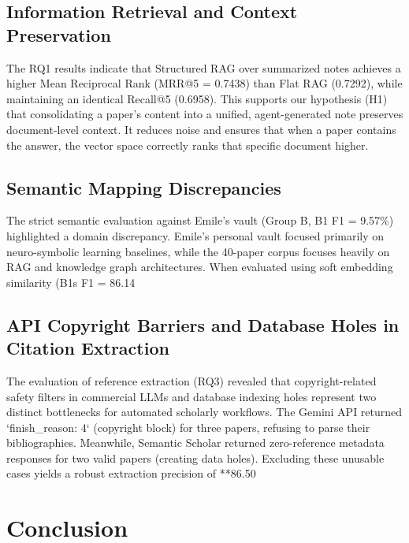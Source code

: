 \documentclass[runningheads]{llncs}
\begin{document}
\subsection{Information Retrieval and Context Preservation}
The RQ1 results indicate that Structured RAG over summarized notes achieves a higher Mean Reciprocal Rank (MRR@5 = 0.7438) than Flat RAG (0.7292), while maintaining an identical Recall@5 (0.6958). This supports our hypothesis (H1) that consolidating a paper's content into a unified, agent-generated note preserves document-level context. It reduces noise and ensures that when a paper contains the answer, the vector space correctly ranks that specific document higher.

\subsection{Semantic Mapping Discrepancies}
The strict semantic evaluation against Emile's vault (Group B, B1 F1 = 9.57\%) highlighted a domain discrepancy. Emile's personal vault focused primarily on neuro-symbolic learning baselines, while the 40-paper corpus focuses heavily on RAG and knowledge graph architectures. When evaluated using soft embedding similarity (B1s F1 = 86.14%

\subsection{API Copyright Barriers and Database Holes in Citation Extraction}
The evaluation of reference extraction (RQ3) revealed that copyright-related safety filters in commercial LLMs and database indexing holes represent two distinct bottlenecks for automated scholarly workflows. The Gemini API returned `finish_reason: 4` (copyright block) for three papers, refusing to parse their bibliographies. Meanwhile, Semantic Scholar returned zero-reference metadata responses for two valid papers (creating data holes). Excluding these unusable cases yields a robust extraction precision of **86.50%

\section{Conclusion}
\label{sec:conclusion}
\end{document}
